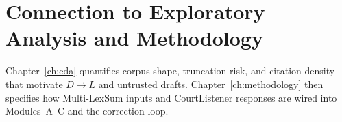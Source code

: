 \section{Connection to Exploratory Analysis and Methodology}
\label{sec:data-bridge}

Chapter~\ref{ch:eda} quantifies corpus shape, truncation risk, and citation density that motivate $D\rightarrow L$ and untrusted drafts. Chapter~\ref{ch:methodology} then specifies how Multi-LexSum inputs and CourtListener responses are wired into Modules~A--C and the correction loop.
